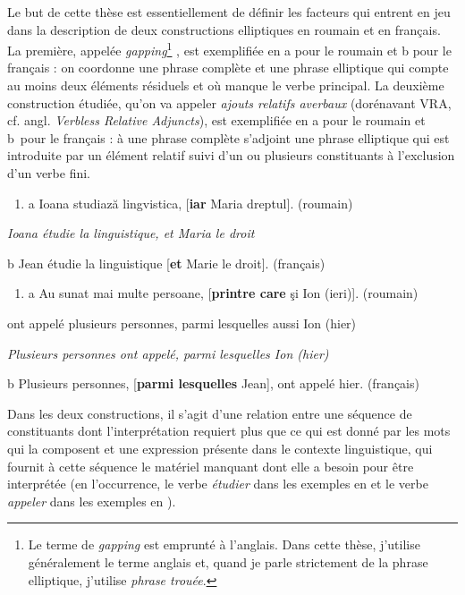 Le but de cette thèse est essentiellement de définir les facteurs qui entrent en jeu dans la description de deux constructions elliptiques en roumain et en français. La première, appelée \textit{gapping}\footnote{Le terme de \textit{gapping} est emprunté à l'anglais. Dans cette thèse, j'utilise généralement le terme anglais et, quand je parle strictement de la phrase elliptique, j'utilise \textit{phrase trouée}.} , est exemplifiée en a pour le roumain et b pour le français : on coordonne une phrase complète et une phrase elliptique qui compte au moins deux éléments résiduels et où manque le verbe principal. La deuxième construction étudiée, qu'on va appeler \textit{ajouts relatifs averbaux} (dorénavant VRA, cf. angl. \textit{Verbless Relative Adjuncts}), est exemplifiée en a pour le roumain et b~pour le français : à une phrase complète s'adjoint une phrase elliptique qui est introduite par un élément relatif suivi d'un ou plusieurs constituants à l'exclusion d'un verbe fini. 


\begin{enumerate}
\item \label{bkm:Ref306208053}a  Ioana studiază lingvistica, [\textbf{iar} Maria dreptul].  (roumain)


\end{enumerate}
{\itshape
Ioana étudie la linguistique, et Maria le droit~}

  b  Jean étudie la linguistique [\textbf{et} Marie le droit].  (français)


\begin{enumerate}
\item \label{bkm:Ref306208494}a  Au  sunat  mai multe  persoane,  [\textbf{printre  care}  şi  Ion  (ieri)]. (roumain)


\end{enumerate}
ont  appelé  plusieurs  personnes,  parmi  lesquelles  aussi  Ion  (hier)

{\itshape
Plusieurs personnes ont appelé, parmi lesquelles Ion (hier)~}

  b  Plusieurs personnes, [\textbf{parmi lesquelles} Jean], ont appelé hier.      (français)

Dans les deux constructions, il s'agit d'une relation entre une séquence de constituants dont l'interprétation requiert plus que ce qui est donné par les mots qui la composent et une expression présente dans le contexte linguistique, qui fournit à cette séquence le matériel manquant dont elle a besoin pour être interprétée (en l'occurrence, le verbe \textit{étudier} dans les exemples en  et le verbe \textit{appeler} dans les exemples en ).

